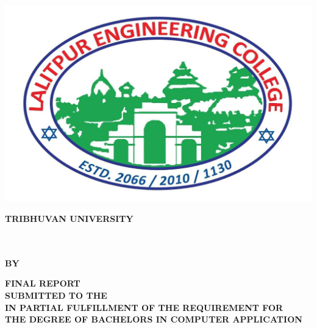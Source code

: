 \thispagestyle{empty}
\begin{center}
\begin{spacing}{1.6}

\includegraphics[scale=0.20]{img/Graphics/lec.jpg}

\textbf{
\large{TRIBHUVAN UNIVERSITY}\\
\MakeUppercase{\large{\theinstitute}}\\
\MakeUppercase{\large{\thecampus}}}

\vspace{0.5cm}

\hspace{-8cm}

\vspace{0.5cm}

\textbf{\MakeUppercase{\thetitle}\\
\vspace{0.5cm} 
BY \\ 
\MakeUppercase{\theauthor}}

\vspace{0.5cm}

\textbf{FINAL REPORT\\
SUBMITTED TO THE \MakeUppercase{\thedepartment}\\ IN PARTIAL FULFILLMENT OF THE REQUIREMENT FOR\\ THE DEGREE OF BACHELORS IN COMPUTER APPLICATION}
\bigskip

\par
\textbf{\MakeUppercase{\thedepartment}}\\
\textbf{\MakeUppercase{\thedepartmentAddress}}
\vspace{1cm}

\textbf{\MakeUppercase{\thedate}}


\end{spacing}
\end{center}

\clearpage